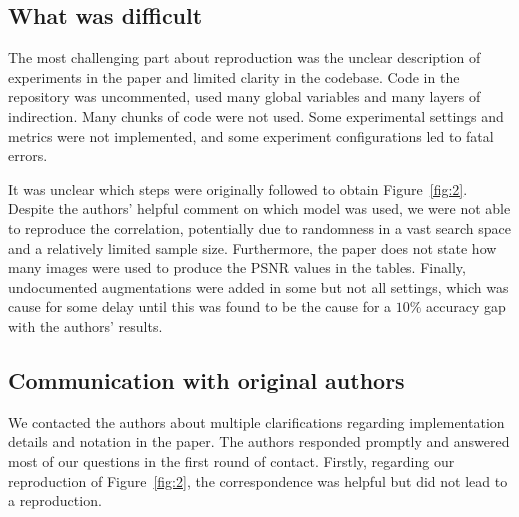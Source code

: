 \subsection{What was difficult}

The most challenging part about reproduction was the unclear description of experiments in the paper and limited clarity in the codebase. Code in the repository was uncommented, used many global variables and many layers of indirection. Many chunks of code were not used. Some experimental settings and metrics were not implemented, and some experiment configurations led to fatal errors.

It was unclear which steps were originally followed to obtain Figure~\ref{fig:2}. Despite the authors' helpful comment on which model was used, we were not able to reproduce the correlation, potentially due to randomness in a vast search space and a relatively limited sample size. Furthermore, the paper does not state how many images were used to produce the PSNR values in the tables. Finally, undocumented augmentations were added in some but not all settings, which was cause for some delay until this was found to be the cause for a $10\%$ accuracy gap with the authors' results.

\subsection{Communication with original authors}

We contacted the authors about multiple clarifications regarding implementation details and notation in the paper. The authors responded promptly and answered most of our questions in the first round of contact. Firstly, regarding our reproduction of Figure~\ref{fig:2}, the correspondence was helpful but did not lead to a reproduction.
